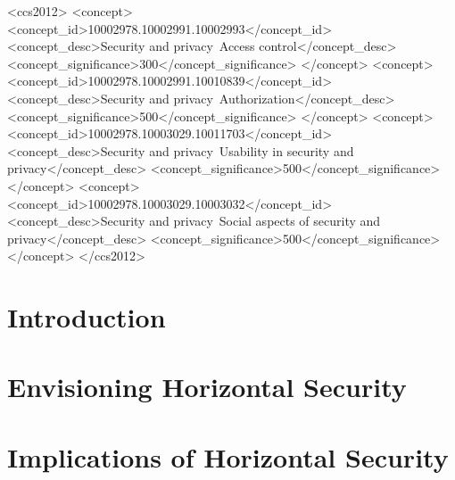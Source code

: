 \documentclass[sigconf, authordraft, anonymous]{acmart}
\theoremstyle{mydef}
\begin{document}
\begin{CCSXML}
<ccs2012>
   <concept>
       <concept_id>10002978.10002991.10002993</concept_id>
       <concept_desc>Security and privacy~Access control</concept_desc>
       <concept_significance>300</concept_significance>
       </concept>
   <concept>
       <concept_id>10002978.10002991.10010839</concept_id>
       <concept_desc>Security and privacy~Authorization</concept_desc>
       <concept_significance>500</concept_significance>
       </concept>
   <concept>
       <concept_id>10002978.10003029.10011703</concept_id>
       <concept_desc>Security and privacy~Usability in security and privacy</concept_desc>
       <concept_significance>500</concept_significance>
       </concept>
   <concept>
       <concept_id>10002978.10003029.10003032</concept_id>
       <concept_desc>Security and privacy~Social aspects of security and privacy</concept_desc>
       <concept_significance>500</concept_significance>
       </concept>
 </ccs2012>
\end{CCSXML}



\maketitle

\section{Introduction}
\label{sec:introduction}


\section{Envisioning Horizontal Security}
\label{sec:envisioning}


\section{Implications of Horizontal Security}
\label{sec:implications}

\end{document}

